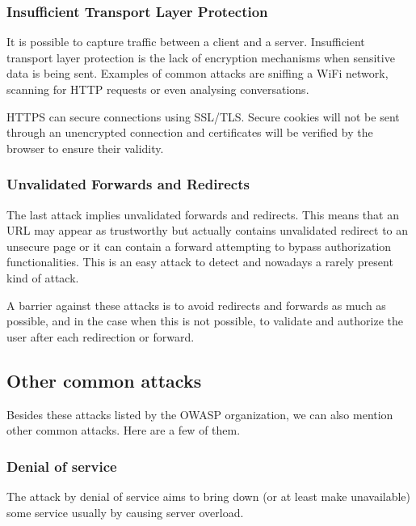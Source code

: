 \subsubsection{Insufficient Transport Layer Protection}

It is possible to capture traffic between a client and a server.
Insufficient transport layer protection is the lack of encryption mechanisms
when sensitive data is being sent.
Examples of common attacks are sniffing a WiFi network, scanning for HTTP
requests or even analysing conversations.

HTTPS can secure connections using SSL/TLS. Secure cookies will not be sent
through an unencrypted connection and certificates will be verified by the
browser to ensure their validity.

\subsubsection{Unvalidated Forwards and Redirects}

The last attack implies unvalidated forwards and redirects. This means that an
URL may appear as trustworthy but actually contains unvalidated redirect to an
unsecure page or it can contain a forward attempting to bypass authorization
functionalities. This is an easy attack to detect and nowadays a rarely
present kind of attack.

A barrier against these attacks is to avoid redirects and forwards as much as
possible, and in the case when this is not possible, to validate and authorize
the user after each redirection or forward.

\subsection{Other common attacks}

Besides these attacks listed by the OWASP organization, we can also mention
other common attacks. Here are a few of them.

\subsubsection{Denial of service}

The attack by denial of service aims to bring down (or at least make
unavailable) some service usually by causing server overload.

